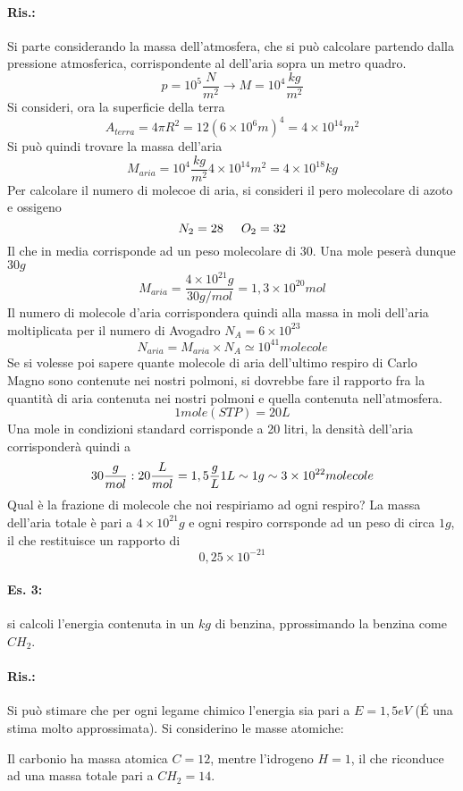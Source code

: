 \paragraph{Ris.:}
Si parte considerando la massa dell'atmosfera, che si può calcolare partendo dalla pressione atmosferica, corrispondente al dell'aria sopra un metro quadro.
\[
p=10^5\frac{N}{m^2}\longrightarrow M=10^4\frac{kg}{m^2}
\]
Si consideri, ora la superficie della terra 
\[
A_{terra}=4\pi R^2=12(6\times10^6m)^4=4\times10^14m^2
\]
Si può quindi trovare la massa dell'aria
\[
M_{aria}=10^4\frac{kg}{m^2}4\times10^{14}m^2=4\times10^{18}kg
\]
Per calcolare il numero di molecoe di aria, si consideri il pero molecolare di azoto e ossigeno
\[
N_2=28\hspace{0,5cm}O_2=32
\]
Il che in media corrisponde ad un peso molecolare di $30$.
Una mole peserà dunque $30g$
\[
M_{aria}=\frac{4\times10^21g}{30g/mol}=1,3\times10^{20}mol
\]
Il numero di molecole d'aria corrispondera quindi alla massa in moli dell'aria moltiplicata per il numero di Avogadro $N_A=6\times10^{23}$
\[
N_{aria}=M_{aria}\times N_A\simeq 10^41molecole
\]
Se si volesse poi sapere quante molecole di aria dell'ultimo respiro di Carlo Magno sono contenute nei nostri polmoni, si dovrebbe fare il rapporto fra la quantità di aria contenuta nei nostri polmoni e quella contenuta nell'atmosfera.
\[
1mole (STP)=20L
\]
Una mole in condizioni standard corrisponde a 20 litri, la densità dell'aria corrisponderà quindi a 
\[
30\frac{g}{mol}:20\frac{L}{mol}=1,5\frac{g}{L}\\
1L\sim 1g\sim 3\times 10^{22}molecole
\]
Qual è la frazione di molecole che noi respiriamo ad ogni respiro?
La massa dell'aria totale è pari a $4\times 10^21g$ e ogni respiro corrsponde ad un peso di circa $1g$, il che restituisce un rapporto di
\[
0,25\times 10^{-21}
\]

\paragraph{Es. 3:}
si calcoli l'energia contenuta in un $kg$ di benzina, pprossimando la benzina come $CH_2$.
\paragraph{Ris.:}
Si può stimare che per ogni legame chimico l'energia sia pari a $E=1,5eV$ (\'E una stima molto approssimata).
Si considerino le masse atomiche:

Il carbonio ha massa atomica $C=12$, mentre l'idrogeno $H=1$, il che riconduce ad una massa totale pari a $CH_2=14$.

